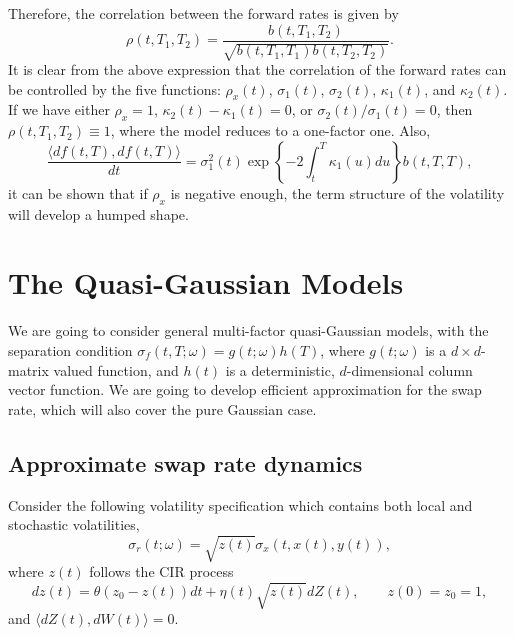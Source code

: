 \documentclass[12pt]{article}
\begin{document}
  Therefore, the correlation between the forward rates is given by
  \begin{equation}
    \rho(t,T_1,T_2)=\frac{b(t,T_1,T_2)}{\sqrt{b(t,T_1,T_1)b(t,T_2,T_2)}}.
  \end{equation}
  It is clear from the above expression that the correlation of the forward rates can be controlled by the five functions: $\rho_x(t)$,
  $\sigma_1(t)$, $\sigma_2(t)$, $\kappa_1(t)$, and $\kappa_2(t)$. If we have either $\rho_x=1$, $\kappa_2(t)-\kappa_1(t)=0$, or $\sigma_2(t)/\sigma_1(t)=0$,
  then $\rho(t,T_1,T_2)\equiv 1$, where the model reduces to a one-factor one. Also,
  \begin{equation}
    \frac{\langle df(t,T), df(t,T)\rangle}{dt}=\sigma_1^2(t)\exp\left\{-2\int_t^{T}\kappa_1(u)du\right\}b(t,T,T),
  \end{equation}
  it can be shown that if $\rho_x$ is negative enough, the term structure of the volatility will develop a humped shape.


\section{The Quasi-Gaussian Models}

  We are going to consider general multi-factor quasi-Gaussian models, with the separation condition $\sigma_f(t,T;\omega)=g(t;\omega)h(T)$,
  where $g(t;\omega)$ is a $d\times d$-matrix valued function, and $h(t)$ is a deterministic, $d$-dimensional column vector function.
  We are going to develop efficient approximation for the swap rate, which will also cover the pure Gaussian case.

  \subsection{Approximate swap rate dynamics}

    Consider the following volatility specification which contains both local and stochastic volatilities,
    \begin{equation}
      \sigma_r(t;\omega) = \sqrt{z(t)}\sigma_x(t,x(t), y(t)),
    \end{equation}
    where $z(t)$ follows the CIR process
    \begin{equation}
      dz(t)=\theta(z_0-z(t))dt+\eta(t)\sqrt{z(t)}dZ(t),\quad\quad z(0)=z_0=1,
    \end{equation}
    and $\langle dZ(t),dW(t)\rangle=0$.
\end{document}

